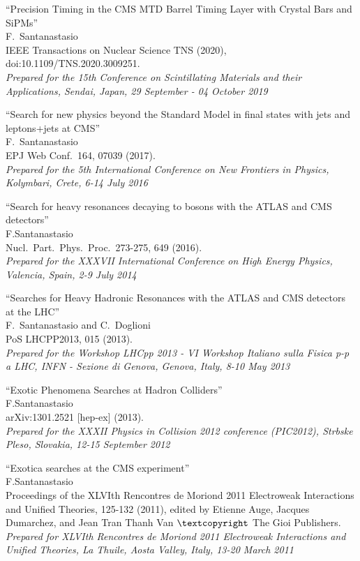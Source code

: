 \documentclass[10pt, a4paper]{article}
\begin{document}
\begin{thebibliography}{599}
  ``Precision Timing in the CMS MTD Barrel Timing Layer with Crystal Bars and SiPMs''\\
  F.~Santanastasio\\
  IEEE Transactions on Nuclear Science TNS (2020), doi:10.1109/TNS.2020.3009251.\\
  {\it Prepared for the 15th Conference on Scintillating Materials and their Applications, Sendai, Japan, 29 September - 04 October 2019} 

  ``Search for new physics beyond the Standard Model in final states with jets and leptons+jets at CMS''\\
 F.~Santanastasio\\
  EPJ Web Conf.\ 164, 07039 (2017).\\
  {\it Prepared for the 5th International Conference on New Frontiers in Physics, Kolymbari, Crete, 6-14 July 2016} 

  ``Search for heavy resonances decaying to bosons with the ATLAS and
  CMS detectors''\\
 F.Santanastasio\\
  Nucl.\ Part.\ Phys.\ Proc.\  273-275, 649 (2016).\\
  {\it Prepared for the XXXVII International Conference on High Energy Physics, Valencia, Spain, 2-9 July 2014}

  ``Searches for Heavy Hadronic Resonances with the ATLAS and CMS
  detectors at the LHC''\\
F.~Santanastasio and C.~Doglioni\\
  PoS LHCPP2013, 015 (2013).\\
  {\it Prepared for the Workshop LHCpp 2013 - VI Workshop Italiano sulla Fisica p-p a LHC, INFN - Sezione di Genova, Genova, Italy, 8-10 May 2013}

  ``Exotic Phenomena Searches at Hadron Colliders''\\
 F.Santanastasio\\
  arXiv:1301.2521 [hep-ex] (2013).\\
  {\it Prepared for the XXXII Physics in Collision 2012 conference (PIC2012), Strbske Pleso, Slovakia, 12-15 September 2012}

``Exotica searches at the CMS experiment''\\
 F.Santanastasio\\
  Proceedings of the XLVIth Rencontres de Moriond 2011 Electroweak Interactions and Unified Theories, 125-132 (2011), edited by Etienne Auge, Jacques Dumarchez, and Jean Tran Thanh Van $\textcopyright$ The Gioi Publishers.\\
{\it Prepared for XLVIth Rencontres de Moriond 2011 Electroweak Interactions and Unified Theories, La Thuile, Aosta Valley, Italy, 13-20 March 2011}


\end{thebibliography}
\end{document}
